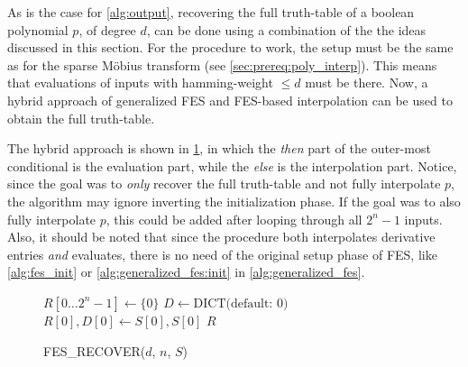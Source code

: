 As is the case for \cref{alg:output}, recovering the full truth-table of a boolean polynomial $p$, of degree $d$, can be done using a combination of the the ideas discussed in this section. For the procedure to work, the setup must be the same as for the sparse Möbius transform (see \cref{sec:prereq:poly_interp}). This means that evaluations of inputs with hamming-weight $\leq d$ must be there. Now, a hybrid approach of generalized FES and FES-based interpolation can be used to obtain the full truth-table. 

The hybrid approach is shown in \cref{alg:fes_recover}, in which the \textit{then} part of the outer-most conditional is the evaluation part, while the \textit{else} is the interpolation part. Notice, since the goal was to \textit{only} recover the full truth-table and not fully interpolate $p$, the algorithm may ignore inverting the initialization phase. If the goal was to also fully interpolate $p$, this could be added after looping through all $2^n - 1$ inputs. Also, it should be noted that since the procedure both interpolates derivative entries \textit{and} evaluates, there is no need of the original setup phase of FES, like \cref{alg:fes_init} or \cref{alg:generalized_fes:init} in \cref{alg:generalized_fes}. 


\begin{figure}[h!t]
    \begin{alg}
        $R[0\dots 2^n - 1] \gets \{0\}$\;
        $D \gets \text{DICT(default: 0)}$\;
        $R[0], D[0] \gets S[0], S[0]$\;
        \Return $R$\;
        \caption{FES\_RECOVER($d$, $n$, $S$)} \label{alg:fes_recover}
    \end{alg}
\end{figure}


\newpage
